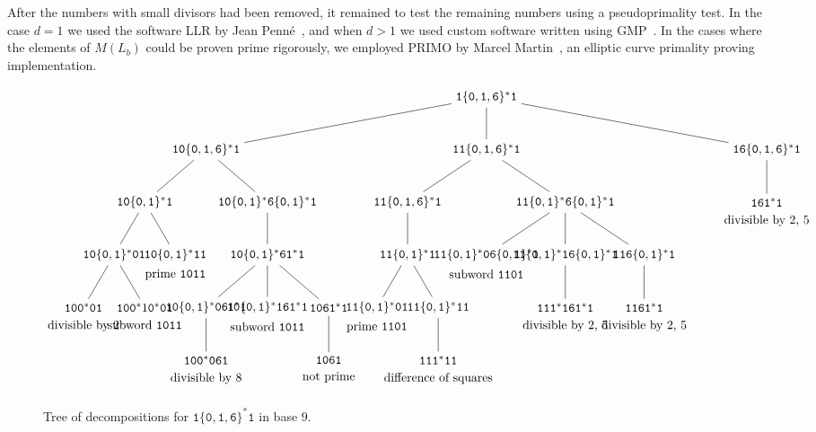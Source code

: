\documentclass[12pt]{article}
\theoremstyle{plain}
\theoremstyle{definition}
\theoremstyle{remark}
\newcommand{\0}{\mathtt{0}}
\newcommand{\1}{\mathtt{1}}
\newcommand{\2}{\mathtt{2}}
\newcommand{\3}{\mathtt{3}}
\newcommand{\4}{\mathtt{4}}
\newcommand{\5}{\mathtt{5}}
\newcommand{\6}{\mathtt{6}}
\newcommand{\7}{\mathtt{7}}
\newcommand{\8}{\mathtt{8}}
\newcommand{\9}{\mathtt{9}}
\begin{document}
After the numbers with small divisors had been removed, it remained to test the remaining numbers using a pseudoprimality test.
In the case $d=1$ we used the software LLR by Jean Penn\'e~\cite{llr}, and when $d>1$ we used custom software written using GMP~\cite{gmp}.
In the cases where the elements of $M(L_b)$ could be proven prime rigorously,
we employed PRIMO by Marcel Martin~\cite{primo}, an elliptic curve primality proving implementation.

\begin{sidewaysfigure}\begin{tiny}\[ \begin{tikzpicture}
\node{$\1\{\0,\1,\6\}^*\1$}[sibling distance=8cm]
	child{node{$\1\0\{\0,\1,\6\}^*\1$}[sibling distance=3.5cm]
		child{node{$\1\0\{\0,\1\}^*\1$}[sibling distance=1.75cm]
			child{node{$\1\0\{\0,\1\}^*\0\1$}
				child{node[label=below:{divisible by 2}]{$\1\0\0^*\0\1$}}
				child{node[label=below:{subword $\1\0\1\1$}]{$\1\0\0^*1\0^*\0\1$}}}
			child{node[label=below:{prime $\1\0\1\1$}]{$\1\0\{\0,\1\}^*\1\1$}}}
		child{node{$\1\0\{\0,\1\}^*\6\{\0,\1\}^*\1$}[sibling distance=1.75cm]
			child{node{$\1\0\{\0,\1\}^*\6\1^*\1$}
				child{node{$\1\0\{\0,\1\}^*\0\6\1^*\1$}
					child{node[label=below:{divisible by 8}]{$\1\0\0^*\0\6\1$}}}
				child{node[label=below:{subword $\1\0\1\1$}]{$\1\0\{\0,\1\}^*\1\6\1^*\1$}}
				child{node{$\1\0\6\1^*\1$}
					child{node[label=below:{not prime}]{$\1\0\6\1$}}}}}}
	child{node{$\1\1\{\0,\1,\6\}^*\1$}[sibling distance=4.5cm]
		child{node{$\1\1\{\0,\1,\6\}^*\1$}[sibling distance=1.75cm]
			child{node{$\1\1\{\0,\1\}^*\1$}
				child{node[label=below:{prime $\1\1\0\1$}]{$\1\1\{\0,\1\}^*\0\1$}}
				child{node{$\1\1\{\0,\1\}^*\1\1$}
					child{node[label=below:{difference of squares}]{$\1\1\1^*\1\1$}}}}}
		child{node{$\1\1\{\0,\1\}^*\6\{\0,\1\}^*\1$}[sibling distance=2.25cm]
			child{node[label=below:{subword $\1\1\0\1$}]{$\1\1\{\0,\1\}^*\0\6\{\0,\1\}^*\1$}}
			child{node{$\1\1\{\0,\1\}^*\1\6\{\0,\1\}^*\1$}
				child{node[label=below:{divisible by 2, 5}]{$\1\1\1^*\1\6\1^*\1$}}}
			child{node{$\1\1\6\{\0,\1\}^*\1$}
				child{node[label=below:{divisible by 2, 5}]{$\1\1\6\1^*\1$}}}}}
	child{node{$\1\6\{\0,\1,\6\}^*\1$}[sibling distance=5cm]
		child{node[label=below:{divisible by 2, 5}]{$\1\6\1^*\1$}[sibling distance=3cm]}};
\end{tikzpicture} \]\end{tiny}\caption{Tree of decompositions for $\1\{\0,\1,\6\}^*\1$ in base $9$.}\label{decomptree}\end{sidewaysfigure}
\end{document}
